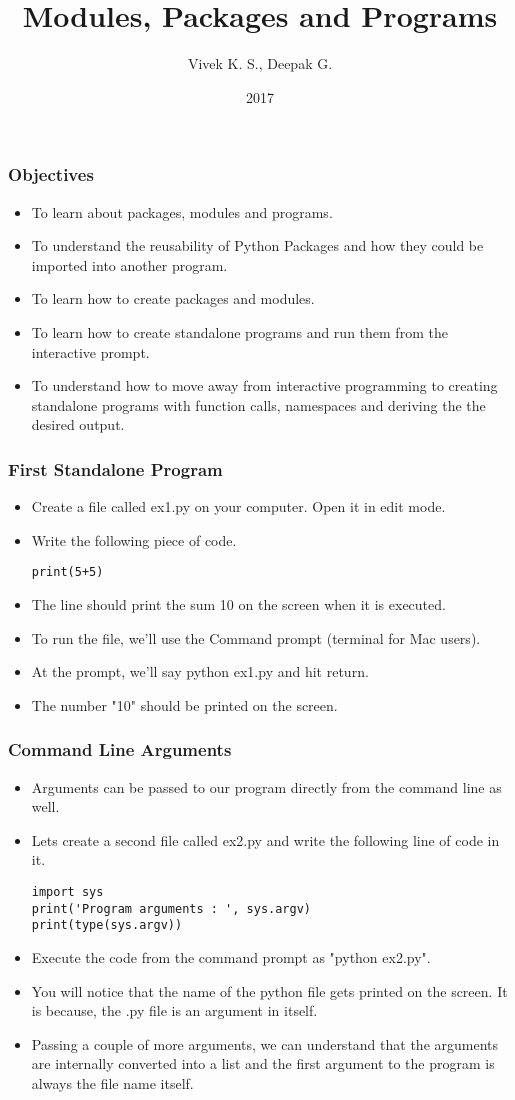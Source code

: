 \documentclass{beamer}
\title{Modules, Packages and Programs}
\author{Vivek K. S., Deepak G.}
\institute{Information Systems Decision Sciences (ISDS)\\
MUMA College of Business\\
University of South Florida \\
Tampa, Florida}
\date{2017}
\begin{document}
\frame{\titlepage}

\begin{frame}
\frametitle{Objectives}
\begin{itemize}
\item To learn about packages, modules and programs.
\item To understand the reusability of Python Packages and how they could be imported  into another program.
\item To learn how to create packages and modules.
\item To learn how to create standalone programs and run them from the interactive prompt.
\item To understand how to move away from interactive programming to creating standalone programs with function calls, namespaces and deriving the the desired output.
\end{itemize}
\end{frame}


\begin{frame}[fragile]
\frametitle{First Standalone Program}
\begin{itemize}
\item Create a file called ex1.py on your computer. Open it in edit mode.
\item Write the following piece of code.
\begin{lstlisting}
print(5+5)
\end{lstlisting}
\item The line should print the sum 10 on the screen when it is executed.
\item To run the file, we'll use the Command  prompt (terminal for Mac users).
\item At the prompt, we'll say python ex1.py and hit return.
\item The number "10" should be printed on the screen.
\end{itemize}
\end{frame}

\begin{frame}[fragile]
\frametitle{Command Line Arguments}
\begin{itemize}
\item Arguments can be passed to our program directly from the command line as well.
\item Lets create a second file called ex2.py and write the following line of code in it.
\begin{lstlisting}
import sys
print('Program arguments : ', sys.argv)
print(type(sys.argv))
\end{lstlisting}
\item Execute the code from the command prompt as "python ex2.py".
\item You will notice that the name of the python file gets printed on the screen. It is because, the .py file is an argument in itself.
\item Passing a couple of more arguments, we can understand that the arguments are internally converted into a list and the first argument to the program is always the file name itself. 
\end{itemize}
\end{frame}
\end{document}
